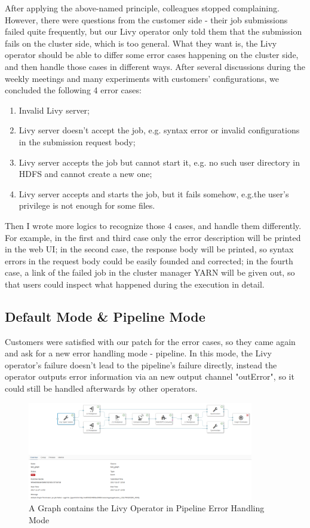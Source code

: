\documentclass[article,colorback,accentcolor=tud4c]{tudreport}
\begin{document}
	After applying the above-named principle, colleagues stopped complaining. However, there were questions from the customer side - their job submissions failed quite frequently, but our Livy operator only told them that the submission fails on the cluster side, which is too general. What they want is, the Livy operator should be able to differ some error cases happening on the cluster side, and then handle those cases in different ways. After several discussions during the weekly meetings and many experiments with customers' configurations, we concluded the following 4 error cases:
	
	\begin{enumerate}
		\item Invalid Livy server;
		\item Livy server doesn't accept the job, e.g. syntax error or invalid configurations in the submission request body;
		\item Livy server accepts the job but cannot start it, e.g. no such user directory in HDFS and cannot create a new one;
		\item Livy server accepts and starts the job, but it fails somehow, e.g.the user's privilege is not enough for some files.
	\end{enumerate}
	
	Then I wrote more logics to recognize those 4 cases, and handle them differently. For example, in the first and third case only the error description will be printed in the web UI; in the second case, the response body will be printed, so syntax errors in the request body could be easily founded and corrected; in the fourth case, a link of the failed job in the cluster manager YARN will be given out, so that users could inspect what happened during the execution in detail.
	
	\subsection{Default Mode \& Pipeline Mode}

	Customers were satisfied with our patch for the error cases, so they came again and ask for a new error handling mode - pipeline. In this mode, the Livy operator's failure doesn't lead to the pipeline's failure directly, instead the operator outputs error information via an new output channel "outError", so it could still be handled afterwards by other operators.
	
	\begin{figure}[!h]
		\centering
		\includegraphics[width=0.88\textwidth]{pipeline_mode_failure}
		\caption{A Graph contains the Livy Operator in Pipeline Error Handling Mode}
	\end{figure}
\end{document}
